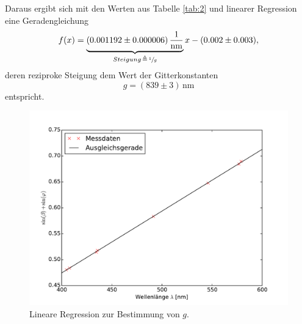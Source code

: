 Daraus ergibt sich mit den Werten aus Tabelle \ref{tab:2} und linearer Regression eine Geradengleichung
\begin{equation}
f(x)= \underbrace{(0.001192 \pm 0.000006)\,\frac{1}{\si{\nano\meter}}}_{Steigung\,\triangleq\,\sfrac{1}{g}}x-(0.002 \pm 0.003),
\label{eq:lin_reg}
\end{equation}
deren reziproke Steigung dem Wert der Gitterkonstanten
\begin{equation}
g=(839 \pm 3)\,\si{\nano\meter}
\label{eq:gitterkonst}
\end{equation}
entspricht.
\begin{figure}
	\centering
	\includegraphics[width=\textwidth]{Bilder/Gitterkonstante.pdf}
	\caption{Lineare Regression zur Bestimmung von $g$.\cite{skript}}
	\label{fig:lin_reg}
\end{figure}
